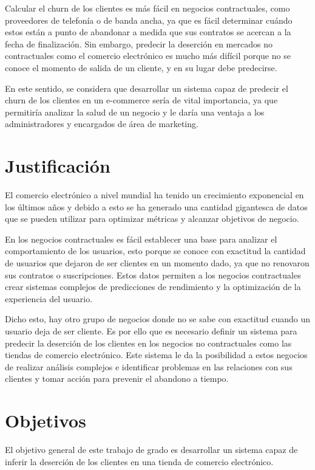 Calcular el churn de los clientes es más fácil en negocios contractuales, como proveedores de telefonía o de banda ancha, ya que es fácil determinar cuándo estos están a punto de abandonar a medida que sus contratos se acercan a la fecha de finalización. Sin embargo, predecir la deserción en mercados no contractuales como el comercio electrónico es mucho más difícil porque no se conoce el momento de salida de un cliente, y en su lugar debe predecirse.


En este sentido, se considera que desarrollar un sistema capaz de predecir el churn de los clientes en un e-commerce sería de vital importancia, ya que permitiría analizar la salud de un negocio y le daría una ventaja a los administradores y encargados de área de marketing.

\section{Justificación}

El comercio electrónico a nivel mundial ha tenido un crecimiento exponencial en los últimos años y debido a esto se ha generado una cantidad gigantesca de datos que se pueden utilizar para optimizar métricas y alcanzar objetivos de negocio.


En los negocios contractuales es fácil establecer una base para analizar el comportamiento de los usuarios, esto porque se conoce con exactitud la cantidad de usuarios que dejaron de ser clientes en un momento dado, ya que no renovaron sus contratos o suscripciones. Estos datos permiten a los negocios contractuales crear sistemas complejos de predicciones de rendimiento y la optimización de la experiencia del usuario.


Dicho esto, hay otro grupo de negocios donde no se sabe con exactitud cuando un usuario deja de ser cliente. Es por ello que es necesario definir un sistema para predecir la deserción de los clientes en los negocios no contractuales como las tiendas de comercio electrónico. Este sistema le da la posibilidad a estos negocios de realizar análisis complejos e identificar problemas en las relaciones con sus clientes y tomar acción para prevenir el abandono a tiempo.

\section{Objetivos}

El objetivo general de este trabajo de grado es desarrollar un sistema capaz de inferir la deserción de los clientes en una tienda de comercio electrónico.


